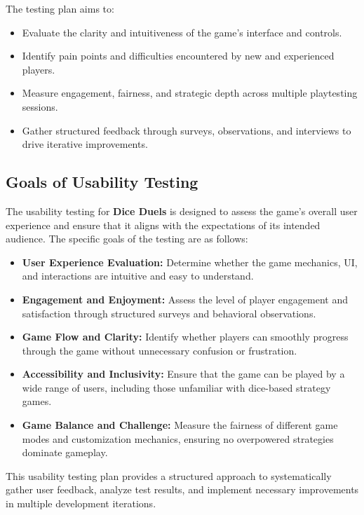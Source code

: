 \documentclass[12pt, titlepage]{article}
\begin{document}
The testing plan aims to:
\begin{itemize}
    \item Evaluate the clarity and intuitiveness of the game's interface and controls.
    \item Identify pain points and difficulties encountered by new and experienced players.
    \item Measure engagement, fairness, and strategic depth across multiple playtesting sessions.
    \item Gather structured feedback through surveys, observations, and interviews to drive iterative improvements.
\end{itemize}

\subsection{Goals of Usability Testing}
The usability testing for \textbf{Dice Duels} is designed to assess the game’s overall user experience and ensure that it aligns with the expectations of its intended audience. The specific goals of the testing are as follows:

\begin{itemize}
    \item \textbf{User Experience Evaluation:} Determine whether the game mechanics, UI, and interactions are intuitive and easy to understand.
    \item \textbf{Engagement and Enjoyment:} Assess the level of player engagement and satisfaction through structured surveys and behavioral observations.
    \item \textbf{Game Flow and Clarity:} Identify whether players can smoothly progress through the game without unnecessary confusion or frustration.
    \item \textbf{Accessibility and Inclusivity:} Ensure that the game can be played by a wide range of users, including those unfamiliar with dice-based strategy games.
    \item \textbf{Game Balance and Challenge:} Measure the fairness of different game modes and customization mechanics, ensuring no overpowered strategies dominate gameplay.
\end{itemize}

This usability testing plan provides a structured approach to systematically gather user feedback, analyze test results, and implement necessary improvements in multiple development iterations.

\newpage
\end{document}
